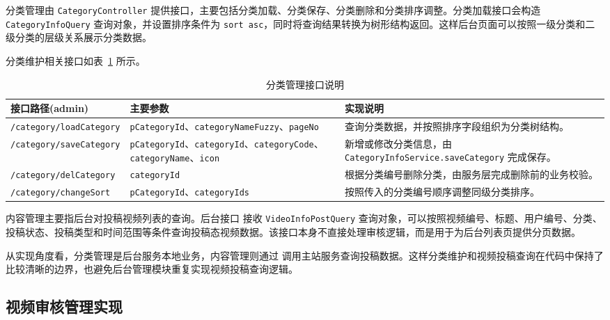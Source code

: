 分类管理由 \texttt{CategoryController} 提供接口，主要包括分类加载、分类保存、分类删除和分类排序调整。分类加载接口会构造 \texttt{CategoryInfoQuery} 查询对象，并设置排序条件为 \texttt{sort asc}，同时将查询结果转换为树形结构返回。这样后台页面可以按照一级分类和二级分类的层级关系展示分类数据。

分类维护相关接口如表~\ref{tab:admin-category-api} 所示。

\begin{table}[!htbp]
    \centering
    \caption{分类管理接口说明}
    \label{tab:admin-category-api}
    \begin{tabular}{p{} p{} p{}}
        \toprule
        \textbf{接口路径(admin)} & \textbf{主要参数} & \textbf{实现说明} \\
        \midrule
        \texttt{/category/loadCategory}
        & \texttt{pCategoryId}、\texttt{categoryNameFuzzy}、\texttt{pageNo}
        & 查询分类数据，并按照排序字段组织为分类树结构。 \\

        \texttt{/category/saveCategory}
        & \texttt{pCategoryId}、\texttt{categoryId}、\texttt{categoryCode}、\texttt{categoryName}、\texttt{icon}
        & 新增或修改分类信息，由 \texttt{CategoryInfoService.saveCategory} 完成保存。 \\

        \texttt{/category/delCategory}
        & \texttt{categoryId}
        & 根据分类编号删除分类，由服务层完成删除前的业务校验。 \\

        \texttt{/category/changeSort}
        & \texttt{pCategoryId}、\texttt{categoryIds}
        & 按照传入的分类编号顺序调整同级分类排序。 \\
        \bottomrule
    \end{tabular}
\end{table}

内容管理主要指后台对投稿视频列表的查询。后台接口 \texttt{} 接收 \texttt{VideoInfoPostQuery} 查询对象，可以按照视频编号、标题、用户编号、分类、投稿状态、投稿类型和时间范围等条件查询投稿态视频数据。该接口本身不直接处理审核逻辑，而是用于为后台列表页提供分页数据。

从实现角度看，分类管理是后台服务本地业务，内容管理则通过 \texttt{} 调用主站服务查询投稿数据。这样分类维护和视频投稿查询在代码中保持了比较清晰的边界，也避免后台管理模块重复实现视频投稿查询逻辑。

\subsection{视频审核管理实现}

